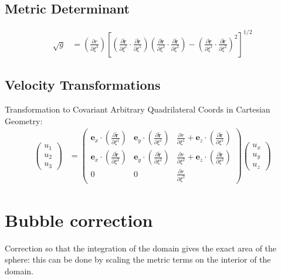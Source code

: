 \documentclass{report}
\newcommand{\vb}{\mathbf}
\newcommand{\tilder}{\widetilde{\vb{r}}}
\newcommand{\pdiff}[2]{\frac{\partial #1}{\partial #2}}
\begin{document}
\subsection{Metric Determinant}

\begin{align}
\sqrt{g} &= \left( \pdiff{r}{\xi^3} \right) \left[ \left( \pdiff{\tilder}{\xi^1} \cdot \pdiff{\tilder}{\xi^1} \right) \left( \pdiff{\tilder}{\xi^2} \cdot \pdiff{\tilder}{\xi^2} \right) - \left( \pdiff{\tilder}{\xi^1} \cdot \pdiff{\tilder}{\xi^2} \right)^2 \right]^{1/2}
\end{align}

\subsection{Velocity Transformations}
Transformation to Covariant Arbitrary Quadrilateral Coords in Cartesian Geometry:
\begin{align}
\label{eq:cov-cartesian-cartesian}
\left( \begin{array}{c} u_1 \\ u_2 \\ u_3 \end{array} \right) 
&= \left( \begin{array}{ccc} \vb{e}_x\cdot\left(\pdiff{\tilder}{\xi^1}\right) & \vb{e}_y\cdot\left(\pdiff{\tilder}{\xi^1}\right) & \pdiff{r}{\xi^1} + \vb{e}_z\cdot\left(  \pdiff{\tilder}{\xi^1}\right)  \\
[2.0ex]  \vb{e}_x\cdot\left(\pdiff{\tilder}{\xi^2}\right) & \vb{e}_y\cdot\left(\pdiff{\tilder}{\xi^2}\right) & \pdiff{r}{\xi^2} + \vb{e}_z\cdot\left( \pdiff{\tilder}{\xi^2}\right) \\
[2.0ex] 0& 0 & \pdiff{r}{\xi^3}  
\end{array}\right) \left( \begin{array}{c} u_x \\ u_y \\ u_z   \end{array} \right)
\end{align}

\section{Bubble correction}

Correction so that the integration of the domain gives the exact area of the sphere: this can be done by scaling the metric terms on the interior of the domain.
\end{document}
